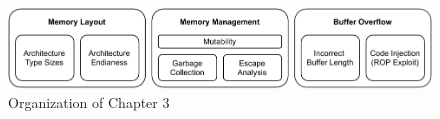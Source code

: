 \begin{figure}[htp!]
    \includegraphics[width=\textwidth]{assets/figures/chapter3/outline3.pdf}
    \caption{Organization of Chapter 3}
    \label{fig:outline3}
\end{figure}
